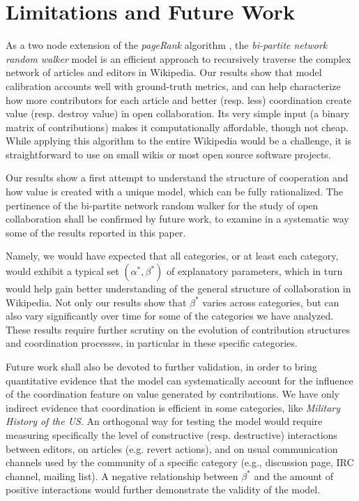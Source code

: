 \section{Limitations and Future Work}
As a two node extension of the {\it pageRank} algorithm \cite{page1999pagerank,kleinberg1999}, the {\it bi-partite network random walker} model is an efficient approach to recursively traverse the complex network of articles and editors in Wikipedia. Our results show that model calibration accounts well with ground-truth metrics, and can help characterize how more contributors for each article and better (resp. less) coordination create value (resp. destroy value) in open collaboration. Its very simple input (a binary matrix of contributions) makes it computationally affordable, though not cheap. While applying this algorithm to the entire Wikipedia would be a challenge, it is straightforward to use on small wikis or most open source software projects.

Our results show a first attempt to understand the structure of cooperation and how value is created with a unique model, which can be fully rationalized. The pertinence of the {bi-partite network random walker} for the study of open collaboration shall be confirmed by future work,  to examine in a systematic way some of the results reported in this paper.

Namely, we would have expected that all categories, or at least each category, would exhibit a typical set $(\alpha^{*},\beta^{*})$ of explanatory parameters, which in turn would help gain better understanding of the general structure of collaboration in Wikipedia. Not only our results show that $\beta^{*}$ varies across categories, but can also vary significantly over time for some of the categories we have analyzed. These results require further scrutiny on the evolution of contribution structures and coordination processes, in particular in these specific categories. 

Future work shall also be devoted to further validation, in order to bring quantitative evidence that the model can systematically account for the influence of the coordination feature on value generated by contributions. We have only indirect evidence that coordination is efficient in some categories, like {\it Military History of the US}. An orthogonal way for testing the model would require measuring specifically the level of constructive (resp. destructive) interactions between editors, on articles (e.g. revert actions), and on usual communication channels used by the community of a specific category (e.g., discussion page, IRC channel, mailing list). A negative relationship between $\beta^{*}$ and the amount of positive interactions would further demonstrate the validity of the model.

